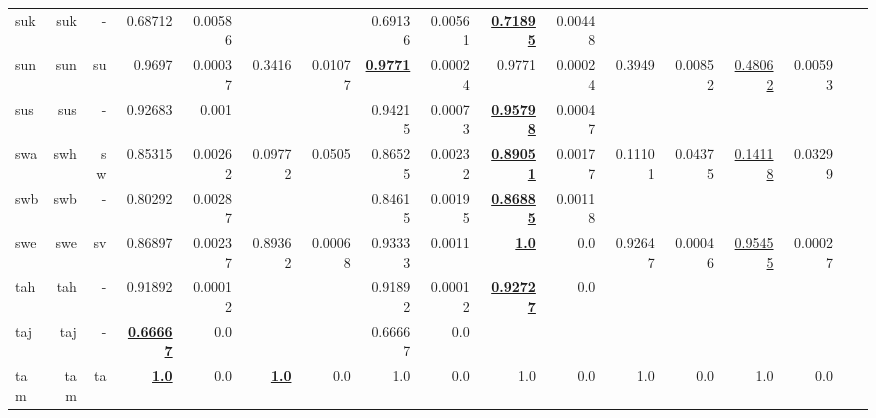 \documentclass[11pt]{article}
\begin{document}
\begin{table*}[h]
{\begin{tabular}{lrrrrrrrrrrrrrrrr}
suk         & suk         & -         & 0.68712         & 0.00586         &          &          & 0.69136         & 0.00561         & \textbf{\underline{0.71895}}         & 0.00448         &          &          &          &          \\
sun         & sun         & su         & 0.9697         & 0.00037         & 0.3416         & 0.01077         & \textbf{\underline{0.9771}}         & 0.00024         & 0.9771         & 0.00024         & 0.3949         & 0.00852         & \underline{0.48062}         & 0.00593         \\
sus         & sus         & -         & 0.92683         & 0.001         &          &          & 0.94215         & 0.00073         & \textbf{\underline{0.95798}}         & 0.00047         &          &          &          &          \\
swa         & swh         & sw         & 0.85315         & 0.00262         & 0.09772         & 0.0505         & 0.86525         & 0.00232         & \textbf{\underline{0.89051}}         & 0.00177         & 0.11101         & 0.04375         & \underline{0.14118}         & 0.03299         \\
swb         & swb         & -         & 0.80292         & 0.00287         &          &          & 0.84615         & 0.00195         & \textbf{\underline{0.86885}}         & 0.00118         &          &          &          &          \\
swe         & swe         & sv         & 0.86897         & 0.00237         & 0.89362         & 0.00068         & 0.93333         & 0.0011         & \textbf{\underline{1.0}}         & 0.0         & 0.92647         & 0.00046         & \underline{0.95455}         & 0.00027         \\
tah         & tah         & -         & 0.91892         & 0.00012         &          &          & 0.91892         & 0.00012         & \textbf{\underline{0.92727}}         & 0.0         &          &          &          &          \\
taj         & taj         & -         & \textbf{\underline{0.66667}}         & 0.0         &          &          & 0.66667         & 0.0         &          &          &          &          &          &          \\
tam         & tam         & ta         & \textbf{\underline{1.0}}         & 0.0         & \textbf{\underline{1.0}}         & 0.0         & 1.0         & 0.0         & 1.0         & 0.0         & 1.0         & 0.0         & 1.0         & 0.0         \\

\end{tabular}}
\end{table*}
\end{document}
